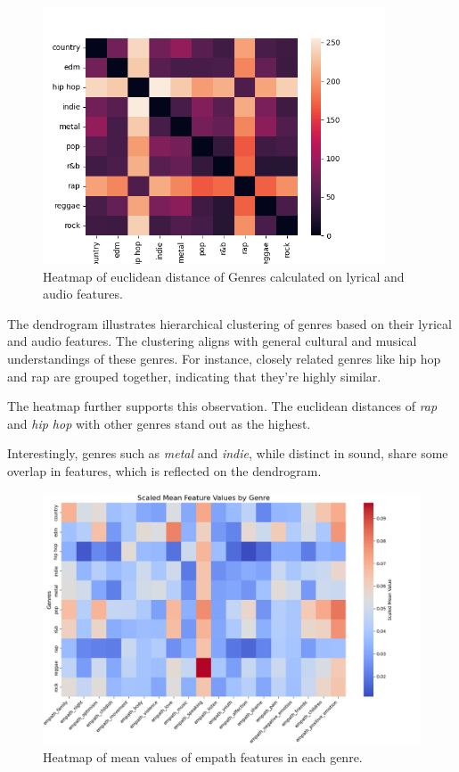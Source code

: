 \begin{center}
\begin{figure}[H]
  \centering
  \includegraphics[width=4in]{img/genres_similarity_heatmap.png}
  \caption{Heatmap of euclidean distance of Genres calculated on lyrical and
  audio features.}
  \label{Figure:dendrogram_spotify_features}
\end{figure}
\end{center}

The dendrogram illustrates hierarchical clustering of genres based on their
lyrical and  audio features. The clustering aligns with general cultural and
musical understandings of  these genres. For instance, closely related  genres
like hip hop and rap are grouped  together, indicating that they're highly
similar.

The heatmap further supports this observation. The euclidean distances of
\textit{rap} and \textit{hip hop} with other genres stand  out as the highest.

Interestingly, genres such as \textit{metal} and \textit{indie}, while distinct
in sound, share some overlap in features, which is reflected on the dendrogram.

\begin{center}
\begin{figure}[H]
  \centering
  \includegraphics[width=6in]{img/heatmap_of_empath.png}
  \caption{Heatmap of mean values of empath features in each genre.}
  \label{Figure:dendrogram_spotify_features}
\end{figure}
\end{center}

